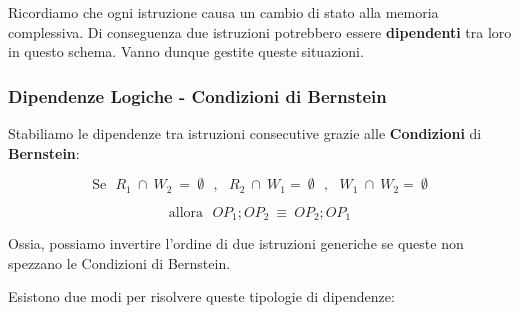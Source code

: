 \documentclass{article}
\begin{document}
\vspace*{15px}

Ricordiamo che ogni istruzione causa un cambio di stato alla memoria complessiva. Di conseguenza due istruzioni potrebbero essere \textbf{dipendenti} tra loro in questo schema. Vanno dunque gestite queste situazioni.

\newpage

\subsubsection{Dipendenze Logiche - Condizioni di Bernstein}

Stabiliamo le dipendenze tra istruzioni consecutive grazie alle \textbf{Condizioni} di \textbf{Bernstein}:

\[ \text{Se} \:\:\: R_{1} \: \cap \: W_{2} \:  = \: \emptyset \:\:\: , \:\:\: R_{2} \: \cap \: W_{1} = \: \emptyset \:\:\: , \:\:\: W_{1} \: \cap \: W_{2} = \: \emptyset \]

\vspace*{-10px}

\[ \text{allora}  \:\:\: OP_{1};OP_{2} \: \equiv \: OP_{2};OP_{1} \]

Ossia, possiamo invertire l'ordine di due istruzioni generiche se queste non spezzano le Condizioni di Bernstein.

Esistono due modi per risolvere queste tipologie di dipendenze:

\vspace*{20px}
\end{document}
